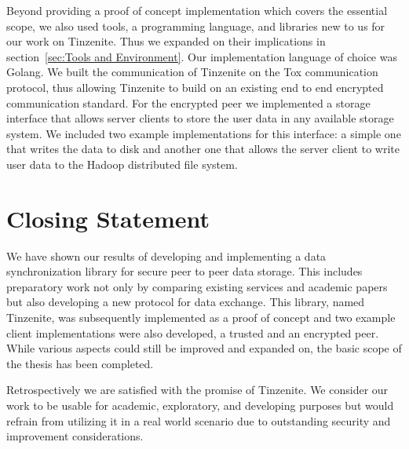Beyond providing a proof of concept implementation which covers the essential scope, we also used tools, a programming language, and  libraries new to us for our work on Tinzenite.
Thus we expanded on their implications in section~\ref{sec:Tools and Environment}.
Our implementation language of choice was Golang.
We built the communication of Tinzenite on the Tox communication protocol, thus allowing Tinzenite to build on an existing end to end encrypted communication standard.
For the encrypted peer we implemented a storage interface that allows server clients to store the user data in any available storage system.
We included two example implementations for this interface: a simple one that writes the data to disk and another one that allows the server client to write user data to the Hadoop distributed file system.

\section{Closing Statement}
\label{sec:Closing Statement}

We have shown our results of developing and implementing a data synchronization library for secure peer to peer data storage.
This includes preparatory work not only by comparing existing services and academic papers but also developing a new protocol for data exchange.
This library, named Tinzenite, was subsequently implemented as a proof of concept and two example client implementations were also developed, a trusted and an encrypted peer.
While various aspects could still be improved and expanded on, the basic scope of the thesis has been completed.

Retrospectively we are satisfied with the promise of Tinzenite.
We consider our work to be usable for academic, exploratory, and developing purposes but would refrain from utilizing it in a real world scenario due to outstanding security and improvement considerations.
